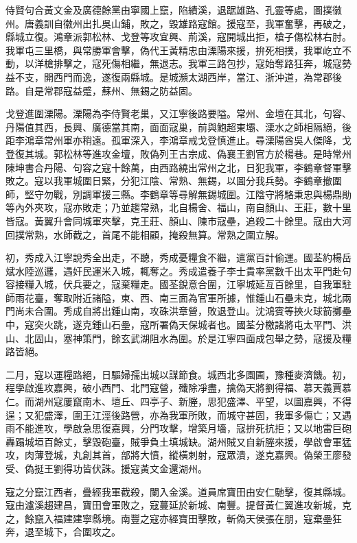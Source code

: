 \begin{pinyinscope}
侍賢句合黃文金及廣德餘黨由寧國上竄，陷績溪，退踞雄路、孔靈等處，圖撲徽州。唐義訓自徽州出扎吳山鋪，敗之，毀雄路寇館。援寇至，我軍奮擊，再破之，縣城立復。鴻章派郭松林、戈登等攻宜興、荊溪，寇開城出拒，槍子傷松林右肘。我軍屯三里橋，與常勝軍會擊，偽代王黃精忠由溧陽來援，拚死相撲，我軍屹立不動，以洋槍排擊之，寇死傷相繼，無退志。我軍三路包抄，寇始奪路狂奔，城寇勢益不支，開西門而逸，遂復兩縣城。是城瀕太湖西岸，當江、浙沖道，為常郡後路。自是常郡寇益蹙，蘇州、無錫之防益固。

戈登進圍溧陽。溧陽為李侍賢老巢，又江寧後路要隘。常州、金壇在其北，句容、丹陽值其西，長興、廣德當其南，面面寇巢，前與鮑超東壩、溧水之師相隔絕，後距李鴻章常州軍亦稍遠。孤軍深入，李鴻章戒戈登慎進止。尋溧陽酋吳人傑降，戈登復其城。郭松林等進攻金壇，敗偽列王古宗成、偽襄王劉官方於楊巷。是時常州陳坤書合丹陽、句容之寇十餘萬，由西路繞出常州之北，日犯我軍，李鶴章督軍擊敗之。寇以我軍城圍日緊，分犯江陰、常熟、無錫，以圖分我兵勢。李鶴章撤圍師，堅守勿戰，別調軍援三縣。李鶴章等尋解無錫城圍。江陰守將駱秉忠與楊鼎勛等內外夾攻，寇亦敗走；乃並趨常熟，北自楊舍、福山，南自顏山、王莊，數十里皆寇。黃翼升會同城軍夾擊，克王莊、顏山、陳市寇壘，追殺二十餘里。寇由大河回撲常熟，水師截之，首尾不能相顧，掩殺無算。常熟之圍立解。

初，秀成入江寧說秀全出走，不聽，秀成憂糧食不繼，遣黨百計偷運。國荃約楊岳斌水陸巡邏，遇奸民運米入城，輒奪之。秀成遣養子李士貴率黨數千出太平門赴句容接糧入城，伏兵要之，寇棄糧走。國荃銳意合圍，江寧城延亙百餘里，自我軍駐師雨花臺，奪取附近諸隘，東、西、南三面為官軍所據，惟鍾山石壘未克，城北兩門尚未合圍。秀成自將出鍾山南，攻硃洪章營，敗退登山。沈鴻賓等挾火球箭擲壘中，寇突火跳，遂克鍾山石壘，寇所署偽天保城者也。國荃分檄諸將屯太平門、洪山、北固山，塞神策門，餘玄武湖阻水為圍。於是江寧四面成包舉之勢，寇援及糧路皆絕。

二月，寇以運糧路絕，日驅婦孺出城以謀節食。城西北多園圃，豫種麥濟饑。初，程學啟進攻嘉興，破小西門、北門寇營，殲除凈盡，擒偽天將劉得福、慕天義賈慕仁。而湖州寇屢竄南木、壇丘、四亭子、新塍，思犯盛澤、平望，以圖嘉興，不得逞；又犯盛澤，圍王江涇後路營，亦為我軍所敗，而城守甚固，我軍多傷亡；又遇雨不能進攻，學啟急思復嘉興，分門攻擊，增築月墻，寇拚死抗拒；又以地雷巨砲轟蹋城垣百餘丈，擊毀砲臺，賊爭負土填城缺。湖州賊又自新塍來援，學啟會軍猛攻，肉薄登城，丸創其首，部將大憤，縱橫刺射，寇眾潰，遂克嘉興。偽榮王廖發受、偽挺王劉得功皆伏誅。援寇黃文金還湖州。

寇之分竄江西者，疊經我軍截殺，闌入金溪。道員席寶田由安仁馳擊，復其縣城。寇由瀘溪趨建昌，寶田會軍敗之，寇蔓延於新城、南豐。提督黃仁翼進攻新城，克之，餘竄入福建建寧縣境。南豐之寇亦經寶田擊敗，斬偽天侯張在朋，寇棄壘狂奔，退至城下，合圍攻之。


\end{pinyinscope}
